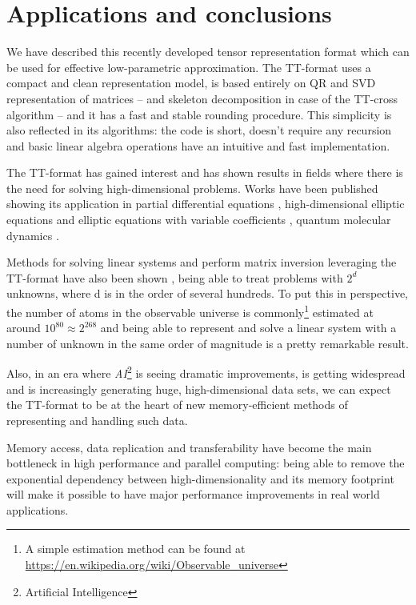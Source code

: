 \chapter{Applications and conclusions}
We have described this recently developed tensor representation format which can be used for effective low-parametric approximation.
The TT-format uses a compact and clean representation model, is based entirely on QR and SVD representation of matrices -- and skeleton decomposition in case of the TT-cross algorithm -- and it has a fast and stable rounding procedure.
This simplicity is also reflected in its algorithms: the code is short, doesn't require any recursion and basic linear algebra operations have an intuitive and fast implementation.

The TT-format has gained interest and has shown results in fields where there is the need for solving high-dimensional problems. Works have been published showing its application in partial differential equations \cite{khoromskij2011qtt}, high-dimensional elliptic equations and elliptic equations with variable coefficients \cite{dolgov2010tensor}, quantum molecular dynamics \cite{khoromskij2010dmrg+}.

Methods for solving linear systems and perform matrix inversion leveraging the TT-format have also been shown \cite{oseledets2012solution}, being able to treat problems with $2^d$ unknowns, where d is in the order of several hundreds. To put this in perspective, the number of atoms in the observable universe is commonly\footnote{A simple estimation method can be found at \href{https://en.wikipedia.org/wiki/Observable_universe}{https://en.wikipedia.org/wiki/Observable\_universe}} estimated at around $10^{80} \approx 2^{268}$ and being able to represent and solve a linear system with a number of unknown in the same order of magnitude is a pretty remarkable result.

Also, in an era where \emph{AI}\footnote{Artificial Intelligence} is seeing dramatic improvements, is getting widespread and is increasingly generating huge, high-dimensional data sets, we can expect the TT-format to be at the heart of new memory-efficient methods of representing and handling such data.

Memory access, data replication and transferability have become the main bottleneck in high performance and parallel computing: being able to remove the exponential dependency between high-dimensionality and its memory footprint will make it possible to have major performance improvements in real world applications.
